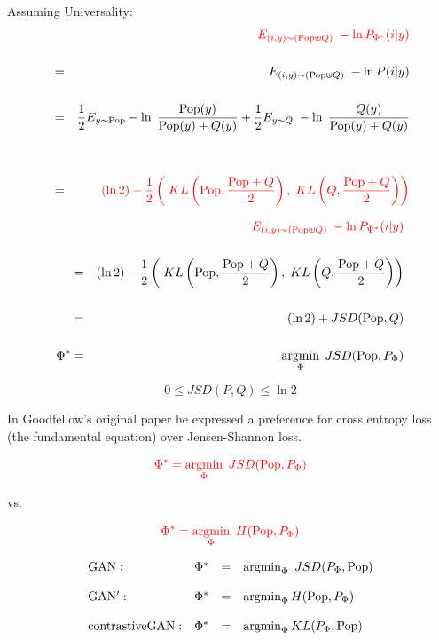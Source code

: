 {Assuming Universality:
\begin{eqnarray*}
& & {\color{red} E_{(i,y) \sim (\mathrm{Pop}\uplus Q)}\;-\ln P_{\Phi^*}(i|y)} \\
\\
& = & E_{(i,y) \sim (\mathrm{Pop}\uplus Q)}\;-\ln P(i|y) \\
\\
& = & \frac{1}{2}E_{y \sim \mathrm{Pop}} -\ln\;\frac{\mathrm{Pop}(y)}{\mathrm{Pop}(y) + Q(y)}+ \frac{1}{2} E_{y \sim Q}\; -\ln\;\frac{Q(y)}{\mathrm{Pop}(y) + Q(y)} \\
\\
\\
& = & {\color{red} (\ln 2) - \frac{1}{2} \left(\;KL\left(\mathrm{Pop},\frac{\mathrm{Pop}+Q}{2}\right),\;KL\left(Q,\frac{\mathrm{Pop}+Q}{2}\right)\right)}
\end{eqnarray*}


\begin{eqnarray*}
& & {\color{red} E_{(i,y) \sim (\mathrm{Pop}\uplus Q)}\;-\ln P_{\Psi^*}(i|y)} \\
\\
& = & (\ln 2) - \frac{1}{2} \left(\;KL\left(\mathrm{Pop},\frac{\mathrm{Pop}+Q}{2}\right),\;KL\left(Q,\frac{\mathrm{Pop}+Q}{2}\right)\right) \\
\\
& = & (\ln 2) + JSD(\mathrm{Pop},Q) \\
\\
\Phi^* & = & \operatorname*{argmin}_\Phi \; JSD(\mathrm{Pop},P_\Phi)
\end{eqnarray*}

{\color{red} $$0 \leq JSD(P,Q) \leq \ln 2$$}



In Goodfellow's original paper he expressed a preference for cross entropy loss (the fundamental equation) over Jensen-Shannon loss.

$${\color{red} \Phi^* = \operatorname*{argmin}_\Phi\;JSD(\mathrm{Pop},P_\Phi)}$$

\centerline{vs.}
\vspace{-2ex}
$${\color{red} \Phi^* = \operatorname*{argmin}_\Phi\;H(\mathrm{Pop},P_\Phi)}$$

{\color{red}
$$\begin{array}{lrcl}
\mathrm{GAN:} & \Phi^* & = & \operatorname*{argmin}_\Phi\;JSD(P_\Phi,\mathrm{Pop}) \\
\\
\mathrm{GAN':} & \Phi^* & = & \operatorname*{argmin}_\Phi H(\mathrm{Pop}, P_\Phi) \\
\\
\mathrm{contrastiveGAN:} & \Phi^* & = & \operatorname*{argmin}_\Phi KL(P_\Phi,\mathrm{Pop})
\end{array}$$
}

}
